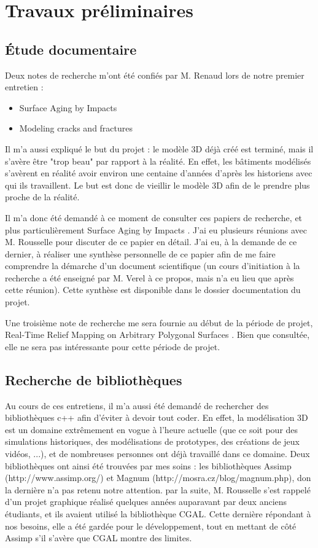 \documentclass[a4paper,french]{article}
\begin{document}
	\section{Travaux préliminaires}
		\subsection{Étude documentaire}
			Deux notes de recherche m'ont été confiés par M. Renaud lors de notre premier entretien : 
				\begin{itemize}
					\item Surface Aging by Impacts \cite{PPD01}
					\item Modeling cracks and fractures \cite{Liris-6004}
				\end{itemize}\par
			Il m'a aussi expliqué le but du projet : le modèle 3D déjà créé est terminé, mais il s'avère être "trop beau" par rapport à la réalité. En effet, les bâtiments modélisés s'avèrent en réalité avoir environ une centaine d'années d'après les historiens avec qui ils travaillent. Le but est donc de vieillir le modèle 3D afin de le prendre plus proche de la réalité. \par
			Il m'a donc été demandé à ce moment de consulter ces papiers de recherche, et plus particulièrement Surface Aging by Impacts \cite{PPD01}. J'ai eu plusieurs réunions avec M. Rousselle pour discuter de ce papier en détail. J'ai eu, à la demande de ce dernier, à réaliser une synthèse personnelle de ce papier afin de me faire comprendre la démarche d'un document scientifique (un cours d'initiation à la recherche a été enseigné par M. Verel à ce propos, mais n'a eu lieu que après cette réunion). Cette synthèse est disponible dans le dossier documentation du projet. \par
			Une troisième note de recherche me sera fournie au début de la période de projet, Real-Time Relief Mapping on Arbitrary Polygonal Surfaces \cite{Policarpo:2005:RRM:1053427.1053453}. Bien que consultée, elle ne sera pas intéressante pour cette période de projet.
			
		\subsection{Recherche de bibliothèques}
			Au cours de ces entretiens, il m'a aussi été demandé de rechercher des bibliothèques c++ afin d'éviter à devoir tout coder. En effet, la modélisation 3D est un domaine extrêmement en vogue à l'heure actuelle (que ce soit pour des simulations historiques, des modélisations de prototypes, des créations de jeux vidéos, ...), et de nombreuses personnes ont déjà travaillé dans ce domaine. Deux bibliothèques ont ainsi été trouvées par mes soins : les bibliothèques Assimp (http://www.assimp.org/) et Magnum (http://mosra.cz/blog/magnum.php), don la dernière n'a pas retenu notre attention. par la suite, M. Rousselle s'est rappelé d'un projet graphique réalisé quelques années auparavant par deux anciens étudiants, et ils avaient utilisé la bibliothèque CGAL. Cette dernière répondant à nos besoins, elle a été gardée pour le développement, tout en mettant de côté Assimp s'il s'avère que CGAL montre des limites. 
		\newpage
		
\end{document}

